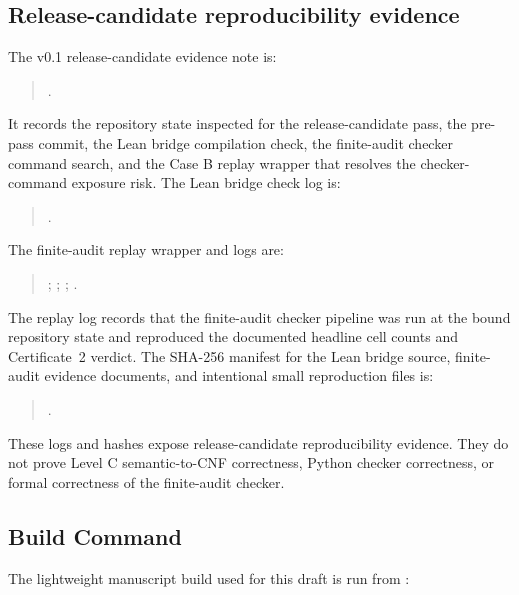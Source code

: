\subsection{Release-candidate reproducibility evidence}

The v0.1 release-candidate evidence note is:

\begin{quote}
.
\end{quote}

It records the repository state inspected for the release-candidate pass, the
pre-pass commit, the Lean bridge compilation check, the finite-audit checker
command search, and the Case B replay wrapper that resolves the checker-command
exposure risk. The Lean bridge check log is:

\begin{quote}
.
\end{quote}

The finite-audit replay wrapper and logs are:

\begin{quote}
;
;
;
.
\end{quote}

The replay log records that the finite-audit checker pipeline was run at the
bound repository state and reproduced the documented headline cell counts and
Certificate~2 verdict. The SHA-256 manifest for the Lean bridge source,
finite-audit evidence documents, and intentional small reproduction files is:

\begin{quote}
.
\end{quote}

These logs and hashes expose release-candidate reproducibility evidence. They
do not prove Level C semantic-to-CNF correctness, Python checker correctness,
or formal correctness of the finite-audit checker.

\subsection{Build Command}

The lightweight manuscript build used for this draft is run from
:

